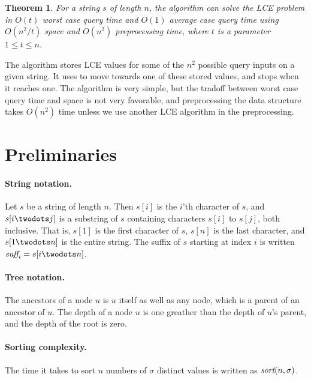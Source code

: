 \documentclass[a4]{article}
\newtheorem{theorem}{Theorem}
\begin{document}
\begin{theorem}
For a string $s$ of length $n$, the  algorithm can solve the LCE problem in $O(t)$ worst case query time and $O(1)$ average case query time using $O(n^2/t)$ space and $O(n^2)$ preprocessing time, where $t$ is a parameter $1 \leq t \leq n$.
\end{theorem}

The algorithm stores LCE values for some of the $n^2$ possible query inputs on a given string. It uses  to move towards one of these stored values, and stops when it reaches one. The  algorithm is very simple, but the tradoff between worst case query time and space is not very favorable, and preprocessing the data structure takes $O(n^2)$ time unless we use another LCE algorithm in the preprocessing.

\fi %

\section{Preliminaries}

\paragraph{String notation.} Let $s$ be a string of length $n$. Then $s[i]$ is the $i$'th character of $s$, and $s[i\twodots j]$ is a substring of $s$ containing characters $s[i]$ to $s[j]$, both inclusive. That is, $s[1]$ is the first character of $s$, $s[n]$ is the last character, and $s[1\twodots n]$ is the entire string. The suffix of $s$ starting at index $i$ is written $\suff_i = s[i\twodots n]$.

\paragraph{Tree notation.}
The ancestors of a node $u$ is $u$ itself as well as any node, which is a parent of an ancestor of $u$. The depth of a node $u$ is one greather than the depth of $u$'s parent, and the depth of the root is zero.

\paragraph{Sorting complexity.} The time it takes to sort $n$ numbers of $\sigma$ distinct values is written as $\textit{sort}(n,\sigma)$.
\end{document}
